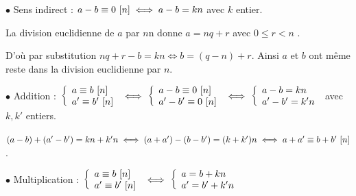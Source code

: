 \documentclass[10pt,a4paper]{article}
\begin{document}
$\bullet$ Sens indirect : ${a-b} \equiv {0} ~ [{n}] \iff a-b=kn$ avec $k$ entier.

La division euclidienne de $a$ par $n$n donne $a=nq+r$ avec $0 \leq r <n$ .

D'où par substitution $nq+r-b=kn \iff b = (q-n)+r$. Ainsi $a$ et $b$ ont même reste dans la division euclidienne par $n$.

\medskip


\dem 

$\bullet$ Addition : $\left\lbrace \begin{array}{l} {a} \equiv {b} ~ [{n}] \\ {a'} \equiv {b'} ~ [{n}] \end{array} \right.
\iff \left\lbrace \begin{array}{l} {a-b} \equiv {0} ~ [{n}] \\ {a'-b'} \equiv {0} ~ [{n}] \end{array} \right. \iff 
\left\lbrace \begin{array}{l} a-b=kn \\ a'-b'=k'n \end{array} \right.$ avec $k,k'$ entiers.

$(a-b)+(a'-b')=kn+k'n \iff (a+a')-(b-b')=(k+k')n \iff {a+a'} \equiv {b+b'} ~ [{n}]$.

$\bullet$ Multiplication : $\left\lbrace \begin{array}{l} {a} \equiv {b} ~ [{n}] \\ {a'} \equiv {b'} ~ [{n}] \end{array} \right.
\iff \left\lbrace \begin{array}{l} a=b+kn \\ a'=b'+k'n \end{array} \right.$
\end{document}
